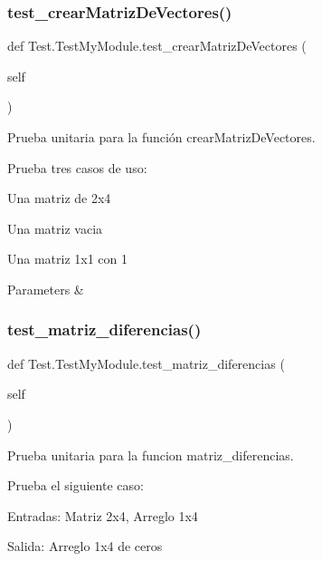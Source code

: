 \subsubsection{\texorpdfstring{test\+\_\+crear\+Matriz\+De\+Vectores()}{test\_crearMatrizDeVectores()}}
{\footnotesize\ttfamily def Test.\+Test\+My\+Module.\+test\+\_\+crear\+Matriz\+De\+Vectores (\begin{DoxyParamCaption}\item[{}]{self }\end{DoxyParamCaption})}



Prueba unitaria para la función crear\+Matriz\+De\+Vectores. 

Prueba tres casos de uso\+:
\begin{DoxyEnumerate}
\item Una matriz de 2x4
\item Una matriz vacia
\item Una matriz 1x1 con 1
\end{DoxyEnumerate}


\begin{DoxyParams}{Parameters}
{\em } & \\
\hline
\end{DoxyParams}
\mbox{\label{class_test_1_1_test_my_module_a39c919b692c45a67055880c5aa38fe6d}} 
\subsubsection{\texorpdfstring{test\+\_\+matriz\+\_\+diferencias()}{test\_matriz\_diferencias()}}
{\footnotesize\ttfamily def Test.\+Test\+My\+Module.\+test\+\_\+matriz\+\_\+diferencias (\begin{DoxyParamCaption}\item[{}]{self }\end{DoxyParamCaption})}



Prueba unitaria para la funcion matriz\+\_\+diferencias. 

Prueba el siguiente caso\+:
\begin{DoxyEnumerate}
\item Entradas\+: Matriz 2x4, Arreglo 1x4
\item Salida\+: Arreglo 1x4 de ceros
\end{DoxyEnumerate}


